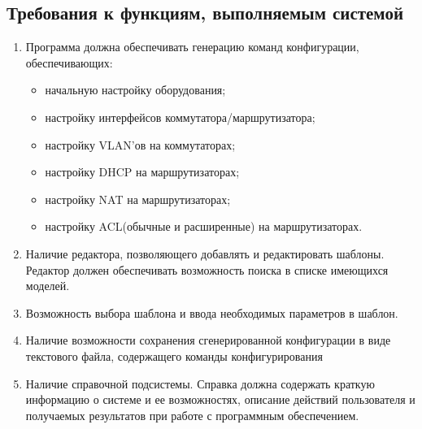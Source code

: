 	\subsection{Требования к функциям, выполняемым системой }
	
	\begin{enumerate}
		
		
		\item Программа должна обеспечивать генерацию команд конфигурации, обеспечивающих:
		\begin{itemize}
			\item начальную настройку оборудования;
			\item настройку интерфейсов коммутатора/маршрутизатора;
			\item настройку VLAN'ов на коммутаторах;
			\item настройку DHCP на маршрутизаторах;
			\item настройку NAT на маршрутизаторах;
			\item настройку ACL(обычные и расширенные) на маршрутизаторах.
		\end{itemize}
		
		\item Наличие редактора, позволяющего добавлять и редактировать шаблоны.  Редактор должен обеспечивать возможность поиска в списке имеющихся моделей. 

		\item Возможность выбора шаблона и ввода необходимых параметров в шаблон.		
		
		
		\item Наличие возможности сохранения сгенерированной конфигурации в виде текстового файла, содержащего команды конфигурирования
		
		\item Наличие справочной подсистемы. Справка должна содержать краткую информацию о системе и ее возможностях, описание действий пользователя и получаемых результатов при работе с программным обеспечением.
	\end{enumerate}
	
